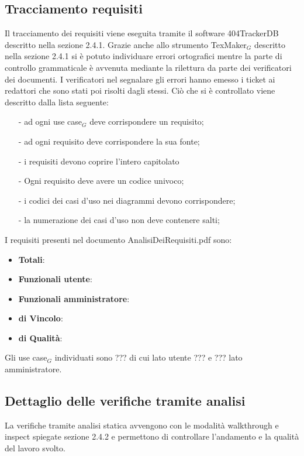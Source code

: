 \subsection{Tracciamento requisiti}
Il tracciamento dei requisiti viene eseguita tramite il software 404TrackerDB descritto nella sezione 2.4.1. 
Grazie anche allo strumento TexMaker$_G$ descritto nella sezione 2.4.1 si è potuto individuare errori ortografici mentre la parte di controllo grammaticale è avvenuta mediante la rilettura da parte dei verificatori dei documenti. I verificatori nel segnalare gli errori hanno emesso i ticket ai redattori che sono stati poi risolti dagli stessi.
Ciò che si è controllato viene descritto dalla lista seguente:
\begin{itemize}
\item[-] ad ogni use case$_G$ deve corrispondere un requisito;
\item[-] ad ogni requisito deve corrispondere la sua fonte;
\item[-] i requisiti devono coprire l'intero capitolato
\item[-] Ogni requisito deve avere un codice univoco;
\item[-] i codici dei casi d'uso nei diagrammi devono corrispondere;
\item[-] la numerazione dei casi d'uso non deve contenere salti;
\end{itemize}
I requisiti presenti nel documento AnalisiDeiRequisiti.pdf sono:
\begin{itemize}
\item \textbf{Totali}: 
\item \textbf{Funzionali utente}:
\item \textbf{Funzionali amministratore}:
\item \textbf{di Vincolo}:
\item \textbf{di Qualità}:
\end{itemize}
Gli use case$_G$ individuati sono ???  di cui lato utente ??? e ??? lato  amministratore.
\subsection{Dettaglio delle verifiche tramite analisi}
La verifiche tramite analisi statica avvengono con le modalità walkthrough e inspect spiegate sezione 2.4.2 e permettono di controllare l'andamento e la qualità del lavoro svolto.
